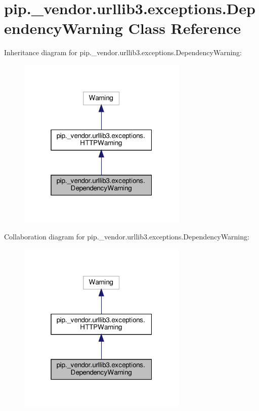 \hypertarget{classpip_1_1__vendor_1_1urllib3_1_1exceptions_1_1DependencyWarning}{}\section{pip.\+\_\+vendor.\+urllib3.\+exceptions.\+Dependency\+Warning Class Reference}
\label{classpip_1_1__vendor_1_1urllib3_1_1exceptions_1_1DependencyWarning}


Inheritance diagram for pip.\+\_\+vendor.\+urllib3.\+exceptions.\+Dependency\+Warning\+:
\nopagebreak
\begin{figure}[H]
\begin{center}
\leavevmode
\includegraphics[width=229pt]{classpip_1_1__vendor_1_1urllib3_1_1exceptions_1_1DependencyWarning__inherit__graph}
\end{center}
\end{figure}


Collaboration diagram for pip.\+\_\+vendor.\+urllib3.\+exceptions.\+Dependency\+Warning\+:
\nopagebreak
\begin{figure}[H]
\begin{center}
\leavevmode
\includegraphics[width=229pt]{classpip_1_1__vendor_1_1urllib3_1_1exceptions_1_1DependencyWarning__coll__graph}
\end{center}
\end{figure}


